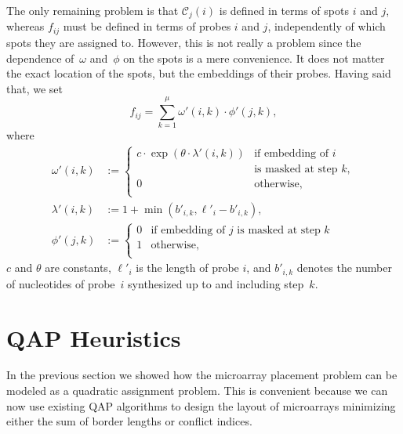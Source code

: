 \documentclass{bioinfo}
\begin{document}
The only remaining problem is that $\mathcal{C}_j(i)$ is defined in terms of spots $i$ and $j$, whereas $f_{ij}$ must be defined in terms of probes $i$ and $j$, independently of which spots they are assigned to. However, this is not really a problem since the dependence of~$\omega$ and~$\phi$ on the spots is a mere convenience. It does not matter the exact location of the spots, but the embeddings of their probes. Having said that, we set
\begin{equation}
f_{ij} = \sum_{k=1}^{\mu} \omega'(i,k) \cdot \phi'(j,k),
\end{equation}
where
\begin{align}
\omega'(i,k) &:=
        \left\{
                \begin{array}{ll}
                        c \cdot \exp{\left(\theta \cdot \lambda'(i,k)\right)} &
                            \mbox{if embedding of $i$} \\
                          & \mbox{is masked at step $k$}, \\
                        0 & \mbox{otherwise}, \\
                \end{array}
        \right. \\
\lambda'(i,k) &:= 1 + \min(b'_{i,k},\ell'_{i} - b'_{i,k}), \\
\phi'(j,k) &:=
        \left\{
                \begin{array}{ll}
                        0 & \mbox{if embedding of $j$ is masked at step $k$} \\
                        1 & \mbox{otherwise}, \\
                \end{array}
        \right.
\end{align}
$c$ and $\theta$ are constants, $\ell'_i$ is the length of probe $i$, and $b'_{i,k}$ denotes the number of nucleotides of probe~$i$ synthesized up to and including step~$k$.

\section{QAP Heuristics}

In the previous section we showed how the microarray placement problem can be modeled as a quadratic assignment problem. This is convenient because we can now use existing QAP algorithms to design the layout of microarrays minimizing either the sum of border lengths or conflict indices. 
\end{document}
